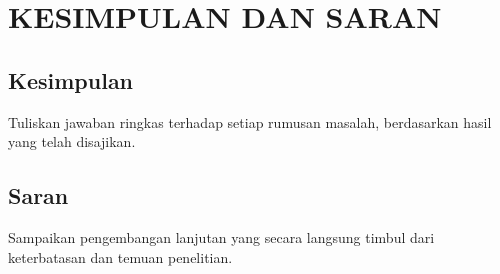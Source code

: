 \chapter{KESIMPULAN DAN SARAN}
\section{Kesimpulan}
Tuliskan jawaban ringkas terhadap setiap rumusan masalah, berdasarkan hasil yang telah disajikan.
\section{Saran}
Sampaikan pengembangan lanjutan yang secara langsung timbul dari keterbatasan dan temuan penelitian.
